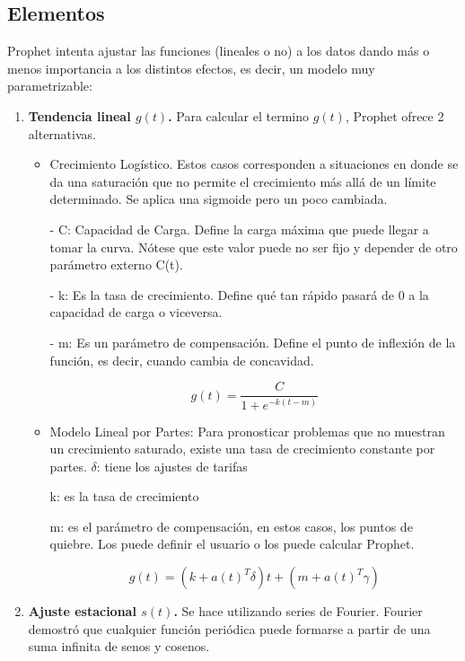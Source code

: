 \documentclass[a4paper,10pt]{article}
\begin{document}
\subsection{Elementos}

Prophet intenta ajustar las funciones (lineales o no) a los datos dando más o menos importancia a los distintos efectos, es decir, un modelo muy parametrizable:

\begin{enumerate}
 \item \textbf{Tendencia lineal $g(t)$.} Para calcular el termino $g(t)$, Prophet ofrece 2 alternativas.

   \begin{itemize}
    \item Crecimiento Logístico. Estos casos corresponden a situaciones en donde se da una saturación que no permite el crecimiento más allá de un límite determinado. Se aplica una sigmoide pero un poco cambiada.

     - C: Capacidad de Carga. Define la carga máxima que puede llegar a tomar la curva. Nótese que este valor puede no ser fijo y depender de otro parámetro externo C(t).

     - k: Es la tasa de crecimiento. Define qué tan rápido pasará de 0 a la capacidad de carga o viceversa.

     - m: Es un parámetro de compensación. Define el punto de inflexión de la función, es decir, cuando cambia de concavidad.

     \begin{equation}
      g(t) = \frac{C}{1+e^{-k(t-m)}}
     \end{equation}


  \item Modelo Lineal por Partes: Para pronosticar problemas que no muestran un crecimiento saturado, existe una tasa de crecimiento constante por partes.
    $\delta$: tiene los ajustes de tarifas

    k: es la tasa de crecimiento

    m: es el parámetro de compensación, en estos casos, los puntos de quiebre. Los puede definir el usuario o los puede calcular Prophet.

    \begin{equation}
     g(t) = (k+a(t)^T\delta)t + (m+a(t)^T\gamma)
    \end{equation}

  \end{itemize}

 \item \textbf{Ajuste estacional $s(t)$.} Se hace utilizando series de Fourier. Fourier demostró que cualquier función periódica puede formarse a partir de una suma infinita de senos y cosenos.


\end{enumerate}
\end{document}

